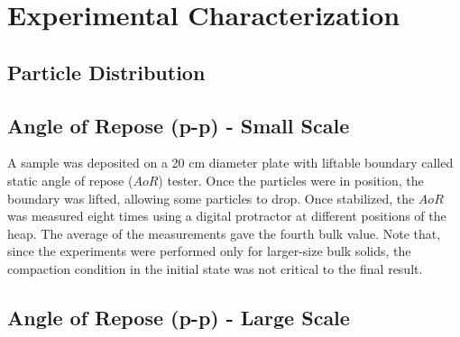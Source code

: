 
\chapter[Experimental Characterization]{Experimental Characterization}
\label{cap:experimentalcharacterization}

\lipsum[1]



\section{Particle Distribution}
\label{sec:particledistribution}

\lipsum[11]
\lipsum[11]
\lipsum[11]
\lipsum[11]
\lipsum[11]
\lipsum[11]



\section{Angle of Repose (p-p) - Small Scale}
\label{sec:aor}


A sample was deposited on a 20 cm diameter plate with liftable boundary called
static angle of repose ($AoR$) tester.
Once the particles were in position, the boundary was lifted, allowing some particles to drop. 
Once stabilized, the $AoR$ was measured eight times using a digital protractor at different positions of the heap. 
The average of the measurements gave the fourth bulk value.
Note that, since the experiments were performed only for larger-size bulk
solids, the compaction condition in the initial state was not critical to the final result.

\section{Angle of Repose (p-p) - Large Scale}
\label{sec:aorlargescale}


